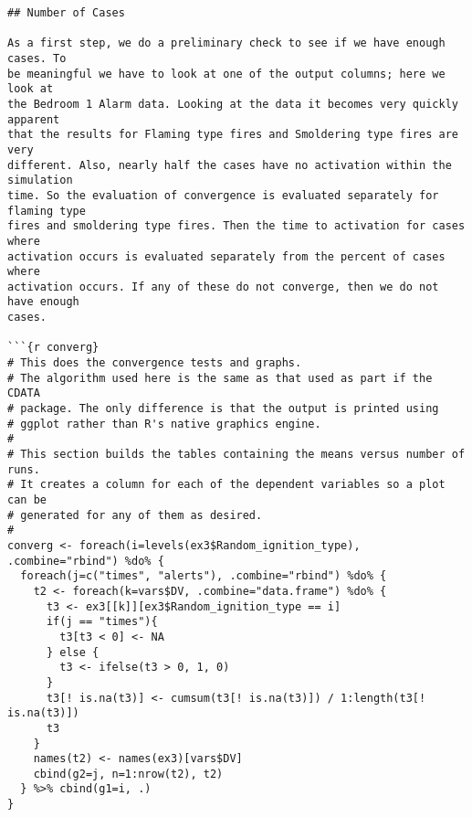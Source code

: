 \begin{lstlisting}[basicstyle=\scriptsize]
## Number of Cases

As a first step, we do a preliminary check to see if we have enough cases. To
be meaningful we have to look at one of the output columns; here we look at
the Bedroom 1 Alarm data. Looking at the data it becomes very quickly apparent
that the results for Flaming type fires and Smoldering type fires are very
different. Also, nearly half the cases have no activation within the simulation
time. So the evaluation of convergence is evaluated separately for flaming type
fires and smoldering type fires. Then the time to activation for cases where
activation occurs is evaluated separately from the percent of cases where
activation occurs. If any of these do not converge, then we do not have enough
cases.

```{r converg}
# This does the convergence tests and graphs.
# The algorithm used here is the same as that used as part if the CDATA
# package. The only difference is that the output is printed using
# ggplot rather than R's native graphics engine.
#
# This section builds the tables containing the means versus number of runs.
# It creates a column for each of the dependent variables so a plot can be
# generated for any of them as desired.
#
converg <- foreach(i=levels(ex3$Random_ignition_type), .combine="rbind") %do% {
  foreach(j=c("times", "alerts"), .combine="rbind") %do% {
    t2 <- foreach(k=vars$DV, .combine="data.frame") %do% {
      t3 <- ex3[[k]][ex3$Random_ignition_type == i]
      if(j == "times"){
        t3[t3 < 0] <- NA
      } else {
        t3 <- ifelse(t3 > 0, 1, 0)
      }
      t3[! is.na(t3)] <- cumsum(t3[! is.na(t3)]) / 1:length(t3[! is.na(t3)])
      t3
    }
    names(t2) <- names(ex3)[vars$DV]
    cbind(g2=j, n=1:nrow(t2), t2)
  } %>% cbind(g1=i, .)
}


\end{lstlisting}
